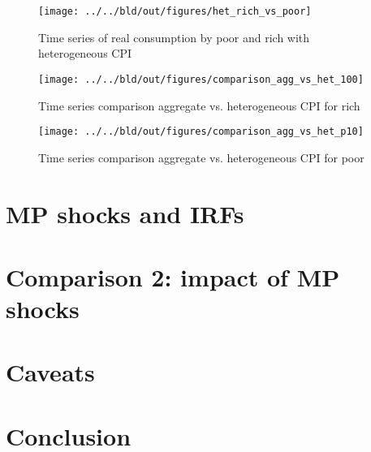 \documentclass{article}
\begin{document}
\begin{figure}
	\centering
	\texttt{[image: ../../bld/out/figures/het\_rich\_vs\_poor]}
	\caption{Time series of real consumption by poor and rich with heterogeneous CPI }
	\label{f2}
\end{figure}

\begin{figure}
	\centering
    \texttt{[image: ../../bld/out/figures/comparison\_agg\_vs\_het\_100]}
	\caption{Time series comparison aggregate vs. heterogeneous CPI for rich}
	\label{f3}
\end{figure}

\begin{figure}
	\centering
	\texttt{[image: ../../bld/out/figures/comparison\_agg\_vs\_het\_p10]}
	\caption{Time series comparison aggregate vs. heterogeneous CPI for poor}
	\label{f4}
\end{figure}

\section{MP shocks and IRFs}\label{shocks}

\section{Comparison 2: impact of MP shocks}\label{res2}

\section{Caveats}

\section{Conclusion}\label{con}


\newpage
{}


\end{document}
